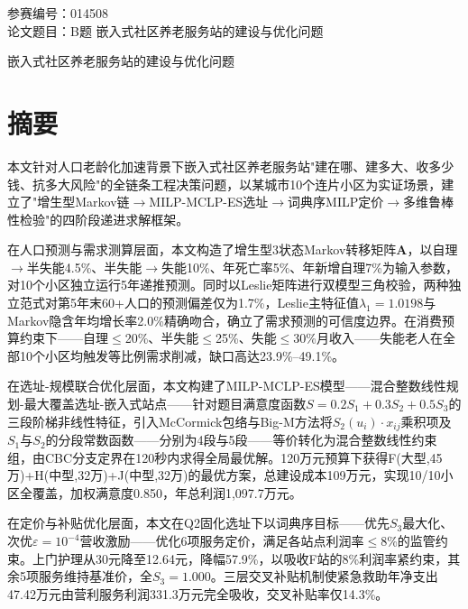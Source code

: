 \documentclass[12pt,a4paper]{ctexart}
\begin{document}
\begin{titlepage}
\begin{center}
\vspace*{3cm}
{\heiti\fontsize{22pt}{28pt}\selectfont 参赛编号：014508}\\[4cm]

{\heiti\fontsize{22pt}{28pt}\selectfont 论文题目：B题 嵌入式社区养老服务站的建设与优化问题}
\end{center}
\end{titlepage}

\setcounter{page}{1}
\pagestyle{plain}

\begin{center}
{\heiti\fontsize{14pt}{20pt}\selectfont 嵌入式社区养老服务站的建设与优化问题}\\[0.4cm]
\end{center}

\section*{\centering 摘\quad 要}

本文针对人口老龄化加速背景下嵌入式社区养老服务站"建在哪、建多大、收多少钱、抗多大风险"的全链条工程决策问题，以某城市10个连片小区为实证场景，建立了"增生型Markov链$\to$MILP-MCLP-ES选址$\to$词典序MILP定价$\to$多维鲁棒性检验"的四阶段递进求解框架。

在人口预测与需求测算层面，本文构造了增生型3状态Markov转移矩阵$\mathbf{A}$，以自理$\to$半失能4.5\%、半失能$\to$失能10\%、年死亡率5\%、年新增自理7\%为输入参数，对10个小区独立运行5年递推预测。同时以Leslie矩阵进行双模型三角校验，两种独立范式对第5年末60+人口的预测偏差仅为1.7\%，Leslie主特征值$\lambda_1=1.0198$与Markov隐含年均增长率2.0\%精确吻合，确立了需求预测的可信度边界。在消费预算约束下——自理$\le$20\%、半失能$\le$25\%、失能$\le$30\%月收入——失能老人在全部10个小区均触发等比例需求削减，缺口高达23.9\%--49.1\%。

在选址-规模联合优化层面，本文构建了MILP-MCLP-ES模型——混合整数线性规划-最大覆盖选址-嵌入式站点——针对题目满意度函数$S=0.2S_1+0.3S_2+0.5S_3$的三段阶梯非线性特征，引入McCormick包络与Big-M方法将$S_2(u_i)\cdot x_{ij}$乘积项及$S_1$与$S_2$的分段常数函数——分别为4段与5段——等价转化为混合整数线性约束组，由CBC分支定界在120秒内求得全局最优解。120万元预算下获得F(大型,45万)+H(中型,32万)+J(中型,32万)的最优方案，总建设成本109万元，实现10/10小区全覆盖，加权满意度0.850，年总利润1,097.7万元。

在定价与补贴优化层面，本文在Q2固化选址下以词典序目标——优先$S_3$最大化、次优$\varepsilon=10^{-4}$营收激励——优化6项服务定价，满足各站点利润率$\le$8\%的监管约束。上门护理从30元降至12.64元，降幅57.9\%，以吸收F站的8\%利润率紧约束，其余5项服务维持基准价，全$S_3=1.000$。三层交叉补贴机制使紧急救助年净支出47.42万元由营利服务利润331.3万元完全吸收，交叉补贴率仅14.3\%。
\end{document}
